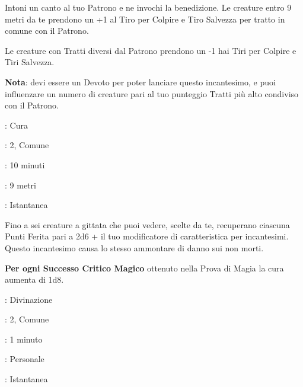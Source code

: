 \begin{multicols}{2}
Intoni un canto al tuo Patrono e ne invochi la benedizione. Le creature entro 9 metri da te prendono un +1 al Tiro per Colpire e Tiro Salvezza per tratto in comune con il Patrono.

Le creature con Tratti diversi dal Patrono prendono un -1 hai Tiri per Colpire e Tiri Salvezza.

\textbf{Nota}: devi essere un Devoto per poter lanciare questo incantesimo, e puoi influenzare un numero di creature pari al tuo punteggio Tratti più alto condiviso con il Patrono.

\noindent\colorbox{OBSSgold!10}{
\begin{minipage}{0.95\linewidth}
\begin{description}[noitemsep, topsep=0pt, parsep=0pt, partopsep=0pt, leftmargin=0cm, labelwidth=1.3cm]
	\item[\textbf{Lista}]: Cura
	\item[\textbf{Livello}]: 2, Comune
	\item[\textbf{Lancio}]: 10 minuti
	\item[\textbf{Gittata}]: 9 metri
	\item[\textbf{Durata}]: Istantanea
\end{description}
\end{minipage}}\smallskip

Fino a sei creature a gittata che puoi vedere, scelte da te, recuperano ciascuna Punti Ferita pari a 2d6 + il tuo modificatore di caratteristica per incantesimi. Questo incantesimo causa lo stesso ammontare di danno sui non morti.

\textbf{Per ogni Successo Critico Magico} ottenuto nella Prova di Magia la cura aumenta di 1d8.

\noindent\colorbox{OBSSgold!10}{
\begin{minipage}{0.95\linewidth}
\begin{description}[noitemsep, topsep=0pt, parsep=0pt, partopsep=0pt, leftmargin=0cm, labelwidth=1.3cm]
	\item[\textbf{Lista}]: Divinazione
	\item[\textbf{Livello}]: 2, Comune
	\item[\textbf{Lancio}]: 1 minuto
	\item[\textbf{Gittata}]: Personale
	\item[\textbf{Durata}]: Istantanea
\end{description}
\end{minipage}}\smallskip


\end{multicols}
